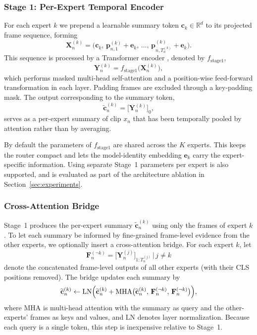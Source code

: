 \documentclass[journal]{IEEEtran}
\begin{document}
\subsubsection{Stage 1: Per-Expert Temporal Encoder}

For each expert $k$ we prepend a learnable summary token
$\mathbf{c}_k\in\mathbb{R}^{d}$ to its projected frame sequence,
forming
\[
\mathbf{X}_n^{(k)} =
\bigl(\mathbf{c}_k,\,\mathbf{p}_{n,1}^{(k)}+\mathbf{e}_k,\,\dots,\,
\mathbf{p}_{n,T_n^{(k)}}^{(k)}+\mathbf{e}_k\bigr).
\]
This sequence is processed by a Transformer encoder
\cite{vaswani2017attention}, denoted by $f_{\text{stage1}}$,
\begin{equation}
\mathbf{Y}_n^{(k)} = f_{\text{stage1}}\bigl(\mathbf{X}_n^{(k)}\bigr),
\label{eq:stage1}
\end{equation}
which performs masked multi-head self-attention and a position-wise
feed-forward transformation in each layer. Padding frames are excluded
through a key-padding mask. The output corresponding to the summary
token,
\[
\widetilde{\mathbf{c}}_n^{(k)} = \bigl[\mathbf{Y}_n^{(k)}\bigr]_{0},
\]
serves as a per-expert summary of clip $x_n$ that has been
temporally pooled by attention rather than by averaging.

By default the parameters of $f_{\text{stage1}}$ are shared across the
$K$ experts. This keeps the router compact and lets the model-identity
embedding $\mathbf{e}_k$ carry the expert-specific information. Using
separate Stage~1 parameters per expert is also supported, and is
evaluated as part of the architecture ablation in
Section~\ref{sec:experiments}.

\subsubsection{Cross-Attention Bridge}

Stage~1 produces the per-expert summary $\widetilde{\mathbf{c}}_n^{(k)}$
using only the frames of expert $k$. To let each summary be informed
by fine-grained frame-level evidence from the other experts,
we optionally insert a cross-attention bridge. For each expert $k$,
let
\[
\mathbf{F}_n^{(\neg k)} = \bigl[\mathbf{Y}_n^{(j)}\bigr]_{1{:}T_n^{(j)}}\,\big|\,j\neq k
\]
denote the concatenated frame-level outputs of all other experts (with
their CLS positions removed). The bridge updates each summary by
\begin{equation}
\widetilde{\mathbf{c}}_n^{(k)} \leftarrow
\mathrm{LN}\Bigl(
\widetilde{\mathbf{c}}_n^{(k)}
+ \mathrm{MHA}\bigl(
\widetilde{\mathbf{c}}_n^{(k)},\,\mathbf{F}_n^{(\neg k)},\,\mathbf{F}_n^{(\neg k)}
\bigr)
\Bigr),
\label{eq:bridge}
\end{equation}
where $\mathrm{MHA}$ is multi-head attention with the summary as
query and the other-experts' frames as keys and values, and
$\mathrm{LN}$ denotes layer normalization. Because each query is a
single token, this step is inexpensive relative to Stage~1.
\end{document}
